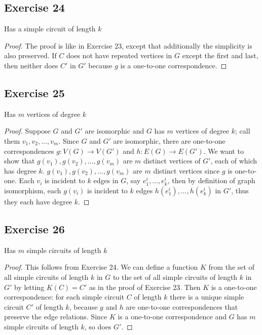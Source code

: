 \documentclass[14pt]{extarticle}
\begin{document}
\subsection{Exercise 24}
Has a simple circuit of length \(k\)

\begin{proof}
The proof is like in Exercise 23, except that additionally the simplicity is also preserved. If \(C\) does not have repeated
vertices in \(G\) except the first and last, then neither does \(C'\) in \(G'\) because \(g\) is a one-to-one correspondence.
\end{proof}

\subsection{Exercise 25}
Has \(m\) vertices of degree \(k\)

\begin{proof}
Suppose \(G\) and \(G'\) are isomorphic and \(G\) has \(m\) vertices of degree \(k\); call them \(v_1, v_2, \ldots, v_m\). 
Since \(G\) and \(G'\) are isomorphic, there are one-to-one correspondences \(g: V(G)\to V(G')\) and \(h: E(G)\to E(G')\). 
We want to show that \(g(v_1), g(v_2), \ldots, g(v_m)\) are \(m\) distinct vertices of \(G'\), each of which has degree 
\(k\). \(g(v_1), g(v_2), \ldots, g(v_m)\) are \(m\) distinct vertices since \(g\) is one-to-one. Each \(v_i\) is incident 
to \(k\) edges in \(G\), say \(e_1^i, \ldots, e_k^i\), then by definition of graph isomorphism, each \(g(v_i)\) is incident 
to \(k\) edges \(h(e_1^i), \ldots, h(e_k^i)\) in \(G'\), thus they each have degree \(k\).
\end{proof}

\subsection{Exercise 26}
Has \(m\) simple circuits of length \(k\)

\begin{proof}
This follows from Exercise 24. We can define a function \(K\) from the set of all simple circuits of length \(k\) in \(G\)
to the set of all simple circuits of length \(k\) in \(G'\) by letting \(K(C) = C'\) as in the proof of Exercise 23. Then 
\(K\) is a one-to-one correspondence: for each simple circuit \(C\) of length \(k\) there is a unique simple circuit \(C'\) 
of length \(k\), because \(g\) and \(h\) are one-to-one correspondences that preserve the edge relations. Since \(K\)
is a one-to-one correspondence and \(G\) has \(m\) simple circuits of length \(k\), so does \(G'\).
\end{proof}
\end{document}
